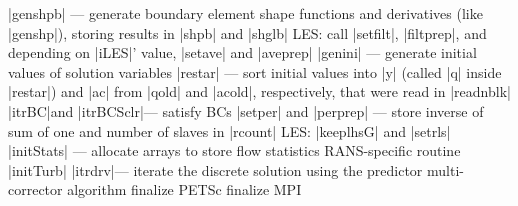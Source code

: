 \documentclass[11pt]{article}
\begin{document}
\begin{outline}[deep]
				\5 |genshpb| --- generate boundary element shape functions and derivatives (like |genshp|), storing results in |shpb| and |shglb|
				\5 LES: call |setfilt|, |filtprep|, and depending on |iLES|' value, |setave| and |aveprep|
				\5 |genini| --- generate initial values of solution variables
					\6 |restar| --- sort initial values into |y| (called |q| inside |restar|) and |ac| from |qold| and |acold|, respectively, that were read in |readnblk|
					\6 |itrBC|\ra and |itrBCSclr|\ra --- satisfy BCs
			\4 |setper| and |perprep| --- store inverse of sum of one and number of slaves in |rcount|
			\4 LES: |keeplhsG| and |setrls|
			\4 |initStats| --- allocate arrays to store flow statistics
			\4 RANS-specific routine |initTurb|
			\4 |itrdrv|\ra --- iterate the discrete solution using the predictor multi-corrector algorithm
		\3 finalize PETSc
	\2 finalize MPI
\end{outline}
\end{document}
